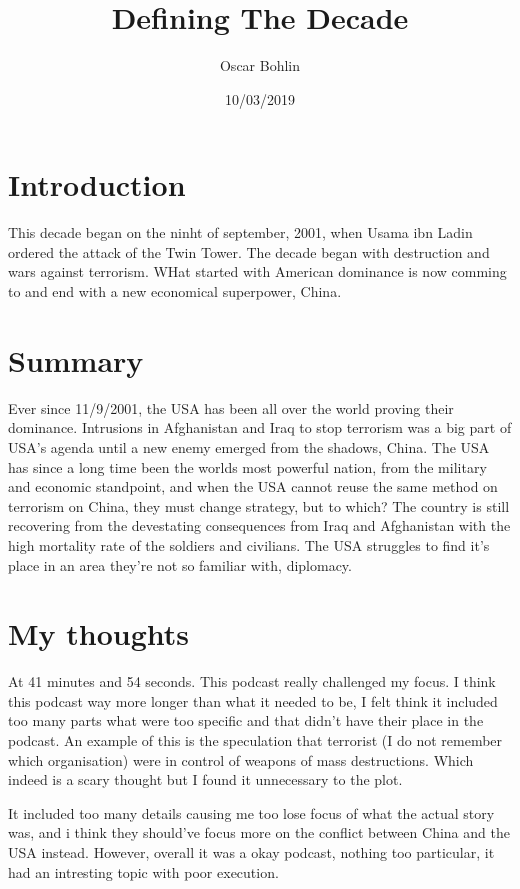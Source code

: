 \documentclass[a4paper, 12pt]{article}
\title{Defining The Decade}
\date{10/03/2019}
\author{Oscar Bohlin}
\begin{document}
\maketitle
\newpage
{}
\tableofcontents
\newpage


\section{Introduction}

    This decade began on the ninht of september, 2001, when Usama ibn Ladin ordered the attack of the Twin Tower. The decade began with destruction and wars against terrorism. WHat started with American dominance is now comming to and end with a new economical superpower, China. 


\section{Summary}

    Ever since 11/9/2001, the USA has been all over the world proving their dominance. Intrusions in Afghanistan and Iraq to stop terrorism was a big part of USA's agenda until a new enemy emerged from the shadows, China. The USA has since a long time been the worlds most powerful nation, from the military and economic standpoint, and when the USA cannot reuse the same method on terrorism on China, they must change strategy, but to which? The country is still recovering from the devestating consequences from Iraq and Afghanistan with the high mortality rate of the soldiers and civilians. The USA struggles to find it's place in an area they're not so familiar with, diplomacy.  



\section{My thoughts}

    At 41 minutes and 54 seconds. This podcast really challenged my focus. I think this podcast way more longer than what it needed to be, I felt think it included too many parts what were too specific and that didn't have their place in the podcast. An example of this is the speculation that terrorist (I do not remember which organisation) were in control of weapons of mass destructions. Which indeed is a scary thought but I found it unnecessary to the plot. 

    It included too many details causing me too lose focus of what the actual story was, and i think they should've focus more on the conflict between China and the USA instead. However, overall it was a okay podcast, nothing too particular, it had an intresting topic with poor execution.  
\end{document}
